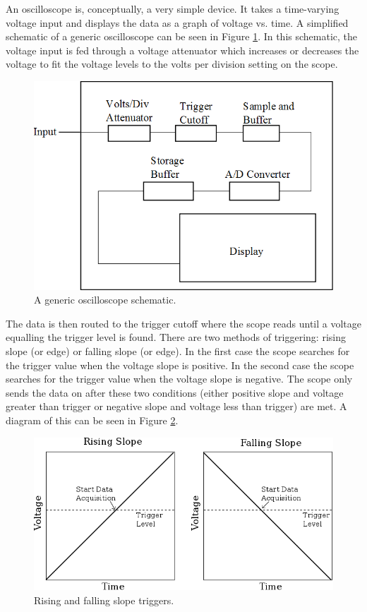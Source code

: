 \documentclass[12pt,reqno]{amsart}
\begin{document}
An oscilloscope is, conceptually, a very simple device. It takes a time-varying voltage input and displays the data as a graph of voltage vs. time. A simplified schematic\hickman{} of a generic oscilloscope can be seen in Figure \ref{fig:generic-oscope}. In this schematic, the voltage input is fed through a voltage attenuator which increases or decreases the voltage to fit the voltage levels to the volts per division setting on the scope.

\begin{figure}[H]
  \begin{center}
    \includegraphics[scale=0.5]{images/generic-oscope.png}
  \end{center}
  \label{fig:generic-oscope}
  \caption{A generic oscilloscope schematic.}
\end{figure}

The data is then routed to the trigger cutoff where the scope reads until a voltage equalling the trigger level is found\hickman{}. There are two methods of triggering: rising slope (or edge) or falling slope (or edge). In the first case the scope searches for the trigger value when the voltage slope is positive. In the second case the scope searches for the trigger value when the voltage slope is negative. The scope only sends the data on after these two conditions (either positive slope and voltage greater than trigger or negative slope and voltage less than trigger) are met. A diagram of this can be seen in Figure \ref{fig:trigger}.

\begin{figure}[H]
  \centering
  \includegraphics[scale=0.5]{images/trigger.png}
  \caption{Rising and falling slope triggers.}
  \label{fig:trigger}
\end{figure}
\end{document}

